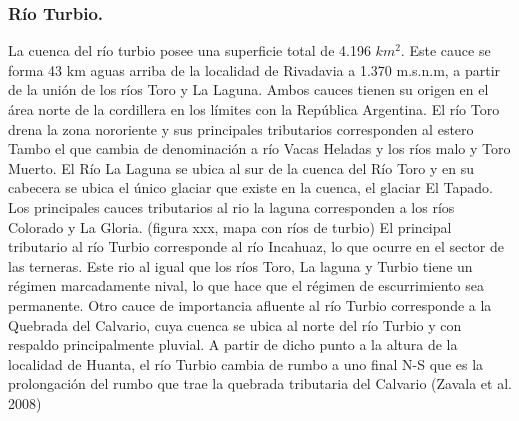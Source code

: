 \documentclass[10pt]{article}
\begin{document}
\subsubsection{Río Turbio.}
La cuenca del río turbio posee una superficie total de 4.196 $km^2$. Este cauce se forma 43 km aguas arriba de la localidad de Rivadavia a 1.370 m.s.n.m, a partir de la unión de los ríos Toro y La Laguna. Ambos cauces tienen su origen en el área norte de la cordillera en los límites con la República Argentina. El río Toro drena la zona nororiente y sus principales tributarios corresponden al estero Tambo el que cambia de denominación a río Vacas Heladas y los ríos malo y Toro Muerto. El Río La Laguna se ubica al sur de la cuenca del Río Toro y en su cabecera se ubica el único glaciar que existe en la cuenca, el glaciar El Tapado. Los principales cauces tributarios al rio la laguna corresponden a los ríos Colorado y La Gloria. (figura xxx, mapa con ríos de turbio) El principal tributario al río Turbio corresponde al río Incahuaz, lo que ocurre en el sector de las terneras. Este rio al igual que los ríos Toro, La laguna y Turbio tiene un régimen marcadamente nival, lo que hace que el régimen de escurrimiento sea permanente. Otro cauce de importancia afluente al río Turbio corresponde a la Quebrada del Calvario, cuya cuenca se ubica al norte del río Turbio y con respaldo principalmente pluvial. A partir de dicho punto a la altura de la localidad de Huanta, el río Turbio cambia de rumbo a uno final N-S que es la prolongación del rumbo que trae la quebrada tributaria del Calvario (Zavala et al. 2008)
\end{document}
